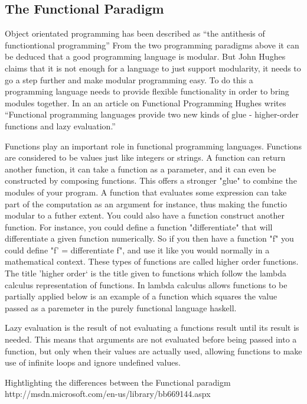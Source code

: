 \documentclass[main.tex]{subfiles}
\begin{document}
\subsection{The Functional Paradigm} %
Object orientated programming has been described as ``the antithesis of functiontional programming'' \cite{Taivalsaari1993} From the two programming paradigms above it can be deduced that a good programming language is modular. But John Hughes claims that it is not enough for a language to just support modularity, it needs to go a step further and make modular programming easy. To do this a programming language needs to provide flexible functionality in order to bring modules together. In an an article on Functional Programming Hughes writes ``Functional programming languages provide two new kinds of glue - higher-order functions and lazy evaluation.''\cite{Hughes1984} 


%
Functions play an important role in functional programming languages. Functions are considered to be values just like integers or strings. A function can return another function, it can take a function as a parameter, and it can even be constructed by composing functions. This offers a stronger "glue" to combine the modules of your program. A function that evaluates some expression can take part of the computation as an argument for instance, thus making the functio modular to a futher extent.
You could also have a function construct another function. For instance, you could define a function "differentiate" that will differentiate a given function numerically. So if you then have a function "f" you could define "f' = differentiate f", and use it like you would normally in a mathematical context. These types of functions are called higher order functions.
%
The title 'higher order` is the title given to functions which follow the lambda calculus representation of functions\cite{Duame2002}. In lambda calculus allows functions to be partially applied
below is an example of a function which squares the value passed as a paremeter in the purely functional language haskell.

Lazy evaluation is the result of not evaluating a functions result until its result is needed. This means that arguments are not evaluated before being passed into a function, but only when their values are actually used, allowing functions to make use of infinite loops and ignore undefined values. 

Hightlighting the differences between the Functional paradigm
http://msdn.microsoft.com/en-us/library/bb669144.aspx
\end{document}
